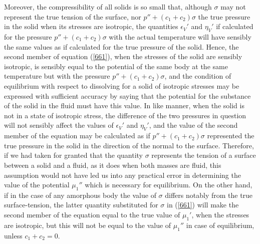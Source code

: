 \documentclass[12pt]{article}
\begin{document}
Moreover, the compressibility of all solids is so small that, although $\sigma$ may not represent the true tension of the surface, nor $p'' + (c_1 + c_2)\sigma$ the true pressure in the solid when its stresses are isotropic, the quantities $\epsilon_V'$ and $\eta_V'$ if calculated for the pressure $p'' + (c_1 + c_2)\sigma$ with the actual temperature will have sensibly the same values as if calculated for the true pressure of the solid. Hence, the second member of equation (\ref{661}), when the stresses of the solid are sensibly isotropic, is sensibly equal to the potential of the same body at the same temperature but with the pressure $p'' + (c_1 + c_2)\sigma$, and the condition of equilibrium with respect to dissolving for a solid of isotropic stresses may be expressed with sufficient accuracy by saying that the potential for the substance of the solid in the fluid must have this value. In like manner, when the solid is not in a state of isotropic stress, the difference of the two pressures in question will not sensibly affect the values of $\epsilon_V'$ and $\eta_V'$, and the value of the second member of the equation may be calculated as if $p'' + (c_1 + c_2)\sigma$ represented the true pressure in the solid in the direction of the normal to the surface. Therefore, if we had taken for granted that the quantity $\sigma$ represents the tension of a surface between a solid and a fluid, as it does when both masses are fluid, this assumption would not have led us into any practical error in determining the value of the potential $\mu_1''$ which is necessary for equilibrium. On the other hand, if in the case of any amorphous body the value of $\sigma$ differs notably from the true surface-tension, the latter quantity substituted for $\sigma$ in (\ref{661}) will make the second member of the equation equal to the true value of $\mu_1'$, when the stresses are isotropic, but this will not be equal to the value of $\mu_1''$ in case of equilibrium, unless $c_1 + c_2 =0$.
\end{document}

